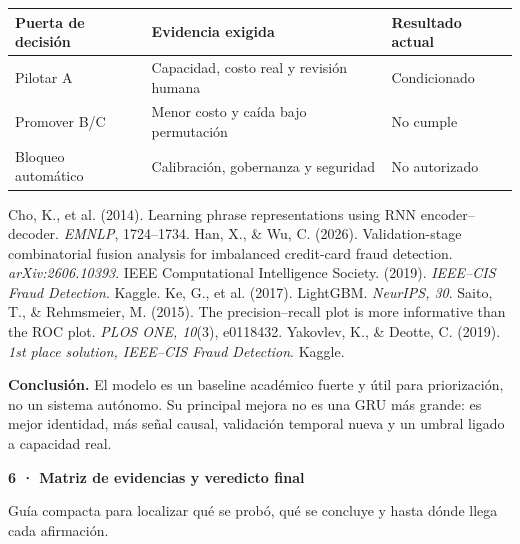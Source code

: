 \documentclass[10pt]{article}
\newcommand{\pagetitle}[2]{%
  {\color{navy}\LARGE\bfseries #1\par}
  \vspace{1.5pt}{\color{teal}\rule{\linewidth}{1.6pt}}\vspace{2pt}
  {\color{muted}\small #2\par}\vspace{5pt}
}
\newcommand{\takeaway}[1]{%
  \begingroup\setlength{\fboxsep}{7pt}%
  \noindent\colorbox{mint}{\parbox{\dimexpr\linewidth-2\fboxsep\relax}{\color{navy}\small\textbf{Conclusión.} #1}}%
  \endgroup
}
\newcommand{\subhead}[1]{\vspace{2pt}{\color{blue}\bfseries #1}\par\vspace{1pt}}
\begin{document}
\vspace{4pt}
\begin{tabularx}{\linewidth}{@{}p{2.25cm}Y Y@{}}
\toprule
\textbf{Puerta de decisión}&\textbf{Evidencia exigida}&\textbf{Resultado actual}\\
\midrule
Pilotar A&Capacidad, costo real y revisión humana&Condicionado\\
Promover B/C&Menor costo y caída bajo permutación&No cumple\\
Bloqueo automático&Calibración, gobernanza y seguridad&No autorizado\\
\bottomrule
\end{tabularx}

\vspace{4pt}
\subhead{Referencias seleccionadas}
\footnotesize
Cho, K., et al. (2014). Learning phrase representations using RNN encoder--decoder. \textit{EMNLP}, 1724--1734.\quad
Han, X., \& Wu, C. (2026). Validation-stage combinatorial fusion analysis for imbalanced credit-card fraud detection. \textit{arXiv:2606.10393}.\quad
IEEE Computational Intelligence Society. (2019). \textit{IEEE--CIS Fraud Detection}. Kaggle.\quad
Ke, G., et al. (2017). LightGBM. \textit{NeurIPS, 30}.\quad
Saito, T., \& Rehmsmeier, M. (2015). The precision--recall plot is more informative than the ROC plot. \textit{PLOS ONE, 10}(3), e0118432.\quad
Yakovlev, K., \& Deotte, C. (2019). \textit{1st place solution, IEEE--CIS Fraud Detection}. Kaggle.

\vspace{4pt}
\takeaway{El modelo es un baseline académico fuerte y útil para priorización, no un sistema autónomo. Su principal mejora no es una GRU más grande: es mejor identidad, más señal causal, validación temporal nueva y un umbral ligado a capacidad real.}

\clearpage

\pagetitle{6 · Matriz de evidencias y veredicto final}{Guía compacta para localizar qué se probó, qué se concluye y hasta dónde llega cada afirmación.}
\end{document}
